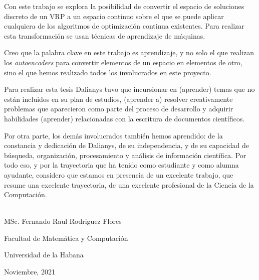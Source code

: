 \begin{opinion}	
	
	Con este trabajo se explora la posibilidad de convertir el espacio de soluciones discreto de un VRP a un espacio continuo sobre el que se puede aplicar cualquiera de los algoritmos de optimización continua existentes.  Para realizar esta transformación se usan técnicas de aprendizaje de máquinas.
	
	Creo que la palabra clave en este trabajo es aprendizaje, y no solo el que realizan los \textit{autoencoders} para convertir elementos de un espacio en elementos de otro, sino el que hemos realizado todos los involucrados en este proyecto.
	
	Para realizar esta tesis Dalianys tuvo que incursionar en (aprender) temas que no están incluidos en su plan de estudios, (aprender a) resolver creativamente problemas que aparecieron como parte del proceso de desarrollo y adquirir habilidades (aprender) relacionadas con la escritura de documentos científicos.
	
	Por otra parte, los demás involucrados también hemos aprendido: de la constancia y dedicación de Dalianys, de su independencia, y de su capacidad de búsqueda, organización, procesamiento y análisis de información científica.  Por todo eso, y por la trayectoria que ha tenido como estudiante y como alumna ayudante, considero que estamos en presencia de un excelente trabajo, que resume una excelente trayectoria, de una excelente profesional de la Ciencia de la Computación.
	
	\vspace{1cm}
	
	
	\begin{flushright}
		\underline{\hspace{6.5cm}}\\
		MSc. Fernando Raul Rodriguez Flores
		
		Facultad de Matemática y Computación
		
		Universidad de la Habana
		
		Noviembre, 2021
	\end{flushright}

\end{opinion}